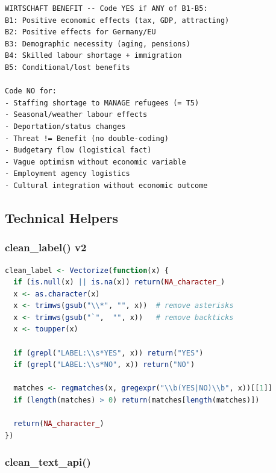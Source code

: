 \begin{lstlisting}[language={},caption={Benefit Instruction --- Key Sections}]
WIRTSCHAFT BENEFIT -- Code YES if ANY of B1-B5:
B1: Positive economic effects (tax, GDP, attracting)
B2: Positive effects for Germany/EU
B3: Demographic necessity (aging, pensions)
B4: Skilled labour shortage + immigration
B5: Conditional/lost benefits

Code NO for:
- Staffing shortage to MANAGE refugees (= T5)
- Seasonal/weather labour effects
- Deportation/status changes
- Threat != Benefit (no double-coding)
- Budgetary flow (logistical fact)
- Vague optimism without economic variable
- Employment agency logistics
- Cultural integration without economic outcome
\end{lstlisting}

\subsection{Technical Helpers}
\label{app:helpers}

\subsubsection*{clean\_label() v2}

\begin{lstlisting}[language=R,caption={\texttt{clean\_label()} --- Robust Label Parser}]
clean_label <- Vectorize(function(x) {
  if (is.null(x) || is.na(x)) return(NA_character_)
  x <- as.character(x)
  x <- trimws(gsub("\\*", "", x))  # remove asterisks
  x <- trimws(gsub("`",  "", x))   # remove backticks
  x <- toupper(x)
  
  if (grepl("LABEL:\\s*YES", x)) return("YES")
  if (grepl("LABEL:\\s*NO", x)) return("NO")
  
  matches <- regmatches(x, gregexpr("\\b(YES|NO)\\b", x))[[1]]
  if (length(matches) > 0) return(matches[length(matches)])
  
  return(NA_character_)
})
\end{lstlisting}

\subsubsection*{clean\_text\_api()}


